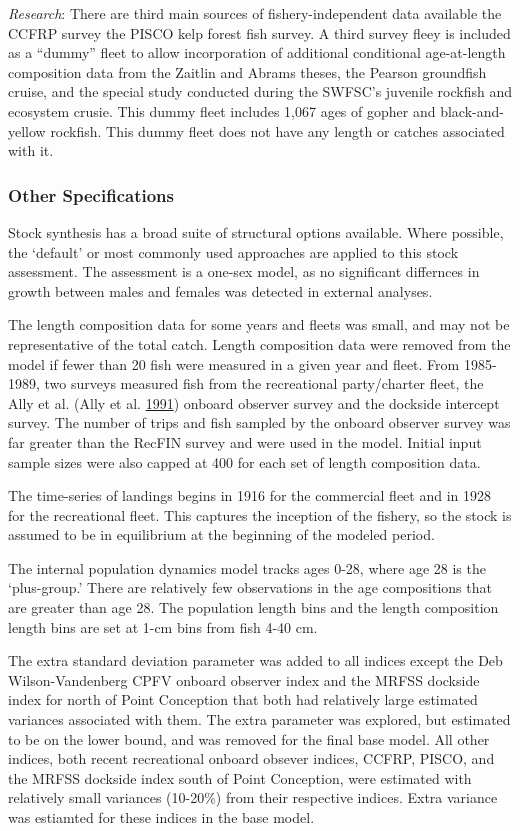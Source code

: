 \documentclass[12pt,]{article}
\begin{document}
\emph{Research}: There are third main sources of fishery-independent
data available the CCFRP survey the PISCO kelp forest fish survey. A
third survey fleey is included as a ``dummy'' fleet to allow
incorporation of additional conditional age-at-length composition data
from the Zaitlin and Abrams theses, the Pearson groundfish cruise, and
the special study conducted during the SWFSC's juvenile rockfish and
ecosystem crusie. This dummy fleet includes 1,067 ages of gopher and
black-and-yellow rockfish. This dummy fleet does not have any length or
catches associated with it.

\subsubsection{Other Specifications}\label{other-specifications}

Stock synthesis has a broad suite of structural options available. Where
possible, the `default' or most commonly used approaches are applied to
this stock assessment. The assessment is a one-sex model, as no
significant differnces in growth between males and females was detected
in external analyses.

The length composition data for some years and fleets was small, and may
not be representative of the total catch. Length composition data were
removed from the model if fewer than 20 fish were measured in a given
year and fleet. From 1985-1989, two surveys measured fish from the
recreational party/charter fleet, the Ally et al. (Ally et al.
\protect\hyperlink{ref-Ally1991}{1991}) onboard observer survey and the
dockside intercept survey. The number of trips and fish sampled by the
onboard observer survey was far greater than the RecFIN survey and were
used in the model. Initial input sample sizes were also capped at 400
for each set of length composition data.

The time-series of landings begins in 1916 for the commercial fleet and
in 1928 for the recreational fleet. This captures the inception of the
fishery, so the stock is assumed to be in equilibrium at the beginning
of the modeled period.

The internal population dynamics model tracks ages 0-28, where age 28 is
the `plus-group.' There are relatively few observations in the age
compositions that are greater than age 28. The population length bins
and the length composition length bins are set at 1-cm bins from fish
4-40 cm.

The extra standard deviation parameter was added to all indices except
the Deb Wilson-Vandenberg CPFV onboard observer index and the MRFSS
dockside index for north of Point Conception that both had relatively
large estimated variances associated with them. The extra parameter was
explored, but estimated to be on the lower bound, and was removed for
the final base model. All other indices, both recent recreational
onboard obsever indices, CCFRP, PISCO, and the MRFSS dockside index
south of Point Conception, were estimated with relatively small
variances (10-20\%) from their respective indices. Extra variance was
estiamted for these indices in the base model.
\end{document}

